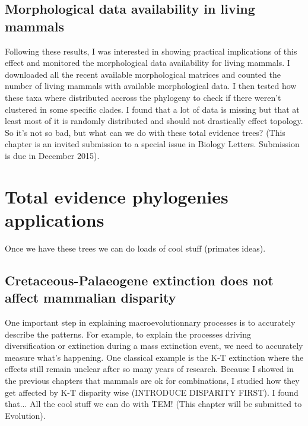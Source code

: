 \subsection{Morphological data availability in living mammals}
Following these results, I was interested in showing practical implications of this effect and monitored the morphological data availability for living mammals.
I downloaded all the recent available morphological matrices and counted the number of living mammals with available morphological data.
I then tested how these taxa where distributed accross the phylogeny to check if there weren't clustered in some specific clades.
I found that a lot of data is missing but that at least most of it is randomly distributed and should not drastically effect topology.
So it's not so bad, but what can we do with these total evidence trees?
(This chapter is an invited submission to a special issue in Biology Letters. Submission is due in December 2015).

\section{Total evidence phylogenies applications}

Once we have these trees we can do loads of cool stuff (primates ideas).

\subsection{Cretaceous-Palaeogene extinction does not affect mammalian disparity}


One important step in explaining macroevolutionnary processes is to accurately describe the patterns.
For example, to explain the processes driving diversification or extinction during a mass extinction event, we need to accurately measure what's happening.
One classical example is the K-T extinction where the effects still remain unclear after so many years of research.
Because I showed in the previous chapters that mammals are ok for combinations, I studied how they get affected by K-T disparity wise (INTRODUCE DISPARITY FIRST).
I found that...
All the cool stuff we can do with TEM!
(This chapter will be submitted to Evolution).


